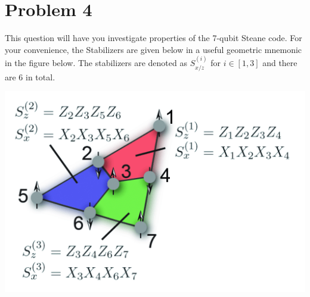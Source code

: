 \documentclass[10pt]{article}
\begin{document}
	\pagebreak
	\section*{Problem 4}
	This question will have you investigate properties of the 7-qubit Steane code. For your convenience, the 
	Stabilizers are given below in a useful geometric mnemonic in the figure below. The stabilizers are denoted as 
	\( S_{x / z}^{(i)} \) for \( i \in [1, 3] \) and there are 6 in total. 
	\begin{center}
		\includegraphics[scale=0.4]{q3c.png}
	\end{center}
\end{document}
